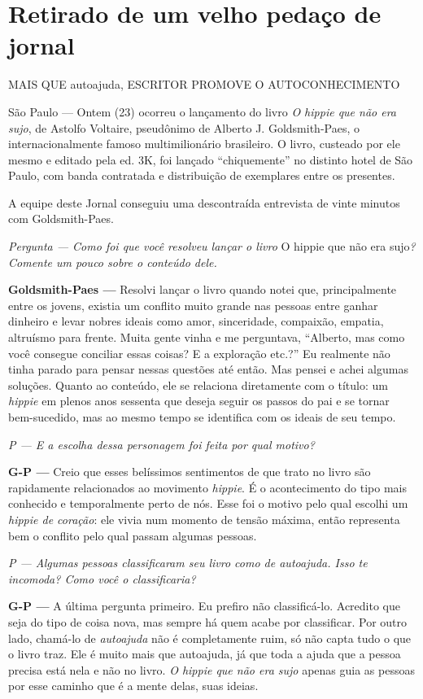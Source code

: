 \chapter{Retirado de um velho pedaço de jornal}

{\Large MAIS QUE autoajuda, ESCRITOR PROMOVE O AUTOCONHECIMENTO}

São Paulo --- Ontem (23) ocorreu o lançamento do livro \emph{O hippie que não era sujo}, de Astolfo Voltaire, pseudônimo de Alberto J. Goldsmith-Paes, o internacionalmente famoso multimilionário brasileiro. O livro, custeado por ele mesmo e editado pela ed. 3K, foi lançado ``chiquemente'' no distinto hotel de São Paulo, com banda contratada e distribuição de exemplares entre os presentes.

A equipe deste Jornal conseguiu uma descontraída entrevista de vinte minutos com Goldsmith-Paes.

\emph{Pergunta --- Como foi que você resolveu lançar o livro} O hippie que não era sujo\emph{? Comente um pouco sobre o conteúdo dele.}

\textbf{Goldsmith-Paes ---} Resolvi lançar o livro quando notei que, principalmente entre os jovens, existia um conflito muito grande nas pessoas entre ganhar dinheiro e levar nobres ideais como amor, sinceridade, compaixão, empatia, altruísmo para frente. Muita gente vinha e me perguntava, ``Alberto, mas como você consegue conciliar essas coisas? E a exploração etc.?'' Eu realmente não tinha parado para pensar nessas questões até então. Mas pensei e achei algumas soluções. Quanto ao conteúdo, ele se relaciona diretamente com o título: um \emph{hippie} em plenos anos sessenta que deseja seguir os passos do pai e se tornar bem-sucedido, mas ao mesmo tempo se identifica com os ideais de seu tempo.

\emph{P --- E a escolha dessa personagem foi feita por qual motivo?}

\textbf{G-P ---} Creio que esses belíssimos sentimentos de que trato no livro são rapidamente relacionados ao movimento \emph{hippie}. É o acontecimento do tipo mais conhecido e temporalmente perto de nós. Esse foi o motivo pelo qual escolhi um \emph{hippie de coração}: ele vivia num momento de tensão máxima, então representa bem o conflito pelo qual passam algumas pessoas.

\emph{P --- Algumas pessoas classificaram seu livro como de \emph{autoajuda}. Isso te incomoda? Como você o classificaria?}

\textbf{G-P ---} A última pergunta primeiro. Eu prefiro não classificá-lo. Acredito que seja do tipo de coisa nova, mas sempre há quem acabe por classificar. Por outro lado, chamá-lo de \emph{autoajuda} não é completamente ruim, só não capta tudo o que o livro traz. Ele é muito mais que autoajuda, já que toda a ajuda que a pessoa precisa está nela e não no livro. \emph{O hippie que não era sujo} apenas guia as pessoas por esse caminho que é a mente delas, suas ideias.

